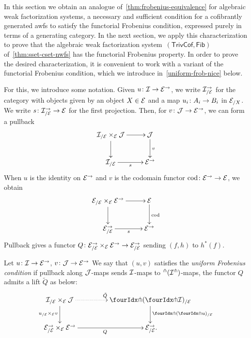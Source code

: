 \documentclass[reqno,10pt,a4paper,oneside,draft]{amsart}
\begin{document}
{{ In this section we obtain an analogue of~\cref{thm:frobenius-equivalence} for algebraic weak factorization systems, \ie 
a necessary and sufficient condition for a cofibrantly generated awfs  to satisfy the functorial Frobenius condition, expressed 
purely in terms of a generating category. In the next section, we apply this characterization  to prove that the algebraic weak 
factorization system~$(\mathsf{TrivCof}, \mathsf{Fib})$ of~\cref{thm:sset-cset-nwfs} has the functorial Frobenius property. 
In order to prove the desired characterization, it is convenient to work with a variant of the functorial Frobenius condition,
which we introduce in~\cref{uniform-frob-nice} below. 

For this, we  introduce some notation. Given $u \co \cal{I} \to \cal{E}^\to$, we write $\cal{I}_{/\cal{E}}^{\to}$ for the category with objects
given by an object $X \in \cal{E}$ and a map  $u_i \co A_i \to B_i$ in $\cal{E}_{/X}$. We write $s \co \cal{I}_{/\cal{E}}^{\to} \to \cal{E}$ for the first projection. Then, for $v \co \cal{J} \to \cal{E}^\to$, we can form a pullback
\[
\xymatrix{
 \cal{I}_{/\cal{E}} \times_{\cal{E}} \cal{J} \ar[r] \ar[d] & 
 \cal{J} \ar[d]^v \\
  \cal{I}_{/\cal{E}} \ar[r]_s &
  \cal{E}^\to}
  \]
When $u$ is the identity on $\cal{E}^\to$ and $v$ is the codomain functor $\cod \co \cal{E}^\to \to \cal{E}$, we obtain
\[
\xymatrix{
 \cal{E}_{/\cal{E}} \times_{\cal{E}} \cal{E}^\to \ar[r] \ar[d] & 
 \cal{E} \ar[d]^{\cod} \\
  \cal{E}^\to_{/\cal{E}} \ar[r]_s &
  \cal{E}^\to}
  \]
Pullback gives a functor $Q \co  \cal{E}^\to_{/\cal{E}} \times_{\cal{E}} \cal{E}^\to \to \cal{E}_{/\cal{E}}^\to$
sending $(f, h)$ to $h^*(f)$. 



\begin{definition} \label{uniform-frob-nice} Let $u \co \cal{I} \to \cal{E}^\to$, $v \co \cal{J} \to \catE^\to$
We say that $(u, v)$  satisfies the \emph{uniform Frobenius condition} if
pullback along $\cal{J}$-maps sends $\cal{I}$-maps to ${}^\pitchfork(\cal{I}^\pitchfork)$-maps, \ie the functor $Q$ admits a lift $\tilde{Q}$ as below:
\begin{equation} \label{uniform-frob-nice:lift}
\begin{gathered}
\xymatrix@C+2em{
  \cal{I}_{/\cal{E}} \times_{\cal{E}} \cal{J}
  \ar@{.>}[r]^{\tilde{Q}}
  \ar[d]_{u_{/\cal{E}} \times_{\cal{E}} v}
&
  \liftl{(\liftr{\cal{I}})}_{/\cal{E}}
  \ar[d]^{\liftl{(\liftr{u})}_{/\cal{E}}}
\\
  \cal{E}^\to_{/\cal{E}} \times_{\cal{E}} \cal{E}^\to
  \ar[r]_{Q}
&
  \cal{E}_{/\cal{E}}^\to
\rlap{.}}
\end{gathered}
\end{equation}
\end{definition}

}}
\end{document}

